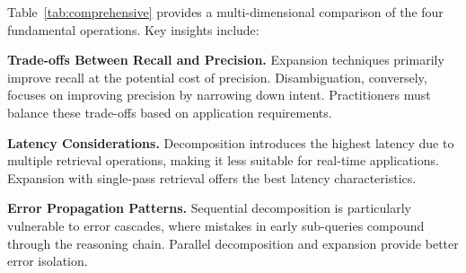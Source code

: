 \documentclass{article}
\begin{document}
\begin{table}[t]
    \centering
    \scriptsize
    \caption{Comprehensive comparison of query optimization operations across multiple dimensions.}
    \label{tab:comprehensive}
\end{table}

Table~\ref{tab:comprehensive} provides a multi-dimensional comparison of the four fundamental operations. Key insights include:

\textbf{Trade-offs Between Recall and Precision.} Expansion techniques primarily improve recall at the potential cost of precision. Disambiguation, conversely, focuses on improving precision by narrowing down intent. Practitioners must balance these trade-offs based on application requirements.

\textbf{Latency Considerations.} Decomposition introduces the highest latency due to multiple retrieval operations, making it less suitable for real-time applications. Expansion with single-pass retrieval offers the best latency characteristics.

\textbf{Error Propagation Patterns.} Sequential decomposition is particularly vulnerable to error cascades, where mistakes in early sub-queries compound through the reasoning chain. Parallel decomposition and expansion provide better error isolation.
\end{document}
